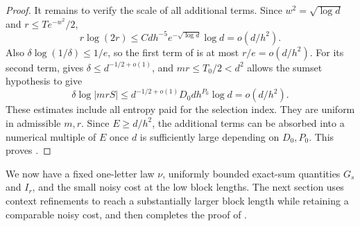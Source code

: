 \begin{proof}
It remains to verify the scale of all additional terms.  Since
$w^2=\sqrt{\log d}$ and $r\le Te^{-w^2}/2$,
\[
 r\log(2r)
   \le Cdh^{-5}e^{-\sqrt{\log d}}\log d=o(d/h^2).
\]
Also $\delta\log(1/\delta)\le1/e$, so the first term of
 is at most $r/e=o(d/h^2)$.
For its second term,  gives
$\delta\le d^{-1/2+o(1)}$, and $mr\le T_0/2<d^2$ allows the sumset
hypothesis to give
\[
 \delta\log|mrS|
      \le d^{-1/2+o(1)}D_0d h^{P_0}\log d=o(d/h^2).
\]
These estimates include all entropy paid for the selection index.  They
are uniform in admissible $m,r$.  Since $E\ge d/h^2$, the additional terms
can be absorbed into a numerical multiple of $E$ once $d$ is sufficiently
large depending on $D_0,P_0$.  This proves .
\end{proof}

We now have a fixed one-letter law $\nu$, uniformly bounded exact-sum
quantities $G_s$ and $I_r$, and the small noisy cost
 at the low block lengths.  The next section uses context
refinements to reach a substantially larger block length while retaining
a comparable noisy cost, and then completes the proof of
.
